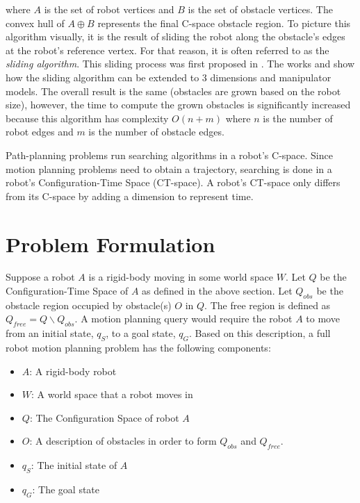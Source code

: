 \documentclass[10pt,conference]{ieeeconf}
\begin{document}
where $A$ is the set of robot vertices and $B$ is the set of obstacle vertices. The convex hull of $A \oplus B$ represents the final C-space obstacle region. To picture this algorithm visually, it is the result of sliding the robot along the obstacle's edges at the robot's reference vertex. For that reason, it is often referred to as the \emph{sliding algorithm}. This sliding process was first proposed in \cite{lozano1979algorithm}. The works \cite{lozano1981automatic} and \cite{lozano1983spatial} show how the sliding algorithm can be extended to 3 dimensions and manipulator models. The overall result is the same (obstacles are grown based on the robot size), however, the time to compute the grown obstacles is significantly increased because this algorithm has complexity $O(n+m)$ where $n$ is the number of robot edges and $m$ is the number of obstacle edges.

Path-planning problems run searching algorithms in a robot's C-space. Since motion planning problems need to obtain a trajectory, searching is done in a robot's Configuration-Time Space (CT-space). A robot's CT-space only differs from its C-space by adding a dimension to represent time.


\section{Problem Formulation} \label{sec:probform}


Suppose a robot $A$ is a rigid-body moving in some world space $W$. Let $Q$ be the Configuration-Time Space of $A$ as defined in the above section. Let $Q_{obs}$ be the obstacle region occupied by obstacle(s) $O$ in $Q$. The free region is defined as $Q_{free} = Q \backslash Q_{obs}$. A motion planning query would require the robot $A$ to move from an initial state, $q_S$, to a goal state, $q_G$. Based on this description, a full robot motion planning problem has the following components:

\begin{itemize}
\item $A$: A rigid-body robot
\item $W$: A world space that a robot moves in
\item $Q$: The Configuration Space of robot $A$
\item $O$: A description of obstacles in order to form $Q_{obs}$ and $Q_{free}$.
\item $q_S$: The initial state of $A$
\item $q_G$: The goal state
\end{itemize}
 
\end{document}
